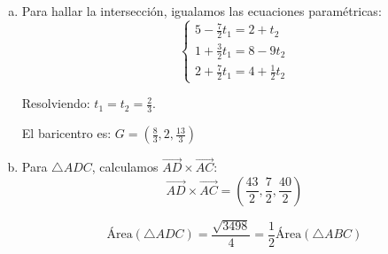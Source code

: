 \begin{prob}
\begin{myproof}
\begin{enumerate}[a)]
El vector director es $\overrightarrow{BE} = \left(1, -9, \frac{1}{2}\right)$.

\begin{multicols}{2}
Ecuaciones paramétricas: $\boxed{\left\{\begin{matrix}
x = 2 + t\\
y = 8 - 9t\\
z = 4 + \frac{1}{2}t
\end{matrix}\right.}$

\columnbreak
\begin{figure}[H]
\centering
{}
\caption{Mediana trazada desde $B$ hasta el punto medio $E$ del lado $\overline{AC}$.}
\label{fig:mediana_desde_B}
\end{figure}
\end{multicols}

\item Para hallar la intersección, igualamos las ecuaciones paramétricas:
$$\left\{\begin{matrix}
5 - \frac{7}{2}t_1 = 2 + t_2 \\
1 + \frac{3}{2}t_1 = 8 - 9t_2\\
2 + \frac{7}{2}t_1 = 4 + \frac{1}{2}t_2
\end{matrix}\right.$$

Resolviendo: $t_1 = t_2 = \frac{2}{3}$.

El baricentro es: $\boxed{G = \left(\frac{8}{3}, 2, \frac{13}{3}\right)}$

\item Para $\triangle ADC$, calculamos $\overrightarrow{AD} \times \overrightarrow{AC}$:
$$\overrightarrow{AD} \times \overrightarrow{AC} = \left(\frac{43}{2}, \frac{7}{2}, \frac{40}{2}\right)$$

$$\text{Área}(\triangle ADC) = \frac{\sqrt{3498}}{4} = \boxed{\frac{1}{2}\text{Área}(\triangle ABC)}$$


\end{enumerate}
\end{myproof}
\end{prob}
